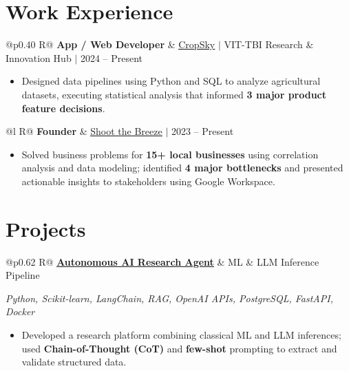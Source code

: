 \documentclass[a4paper,10pt]{article}
\newcommand{\ulink}[2]{\href{#1}{\uline{#2}}}
\newcommand{\subheading}[1]{{\color[HTML]{0A0A0A}\fontsize{12}{14}\selectfont\bfseries #1}}
\newcommand{\techstack}[1]{{\color[HTML]{5C5C5C}\fontsize{10.5}{12.5}\selectfont\itshape #1}}
\newcommand{\meta}[1]{{\color[HTML]{5C5C5C}\fontsize{10.5}{12.5}\selectfont #1}}
\begin{document}
\section{Work Experience}
\vspace{2pt}

\begin{tabularx}{\linewidth}{@{}p{0.40\linewidth} R@{}}
\subheading{App / Web Developer} & \meta{\ulink{https://sites.google.com/view/cropsky/home}{CropSky} $|$ VIT-TBI Research \& Innovation Hub $|$ 2024 -- Present}
\end{tabularx}
\begin{itemize}[nosep, leftmargin=1.5em, itemsep=1pt, topsep=2pt]
  \item {\color[HTML]{0A0A0A}\fontsize{11}{14}\selectfont Designed data pipelines using Python and SQL to analyze agricultural datasets, executing statistical analysis that informed \textbf{3 major product feature decisions}.}
\end{itemize}

\vspace{2pt}

\begin{tabularx}{\linewidth}{@{}l R@{}}
\subheading{Founder} & \meta{\ulink{https://shoot-the-breeze.vercel.app}{Shoot the Breeze} $|$ 2023 -- Present}
\end{tabularx}
\begin{itemize}[nosep, leftmargin=1.5em, itemsep=1pt, topsep=2pt]
  \item {\color[HTML]{0A0A0A}\fontsize{11}{14}\selectfont Solved business problems for \textbf{15+ local businesses} using correlation analysis and data modeling; identified \textbf{4 major bottlenecks} and presented actionable insights to stakeholders using Google Workspace.}
\end{itemize}

\vspace{2pt}

\section{Projects}
\vspace{2pt}

\begin{tabularx}{\linewidth}{@{}p{0.62\linewidth} R@{}}
\subheading{\ulink{https://github.com/su-jin1425/Autonomous-Research-Agent}{Autonomous AI Research Agent}} & \meta{ML \& LLM Inference Pipeline}
\end{tabularx}
\vspace{1pt}
\techstack{Python, Scikit-learn, LangChain, RAG, OpenAI APIs, PostgreSQL, FastAPI, Docker}
\begin{itemize}[nosep, leftmargin=1.5em, itemsep=1pt, topsep=2pt]
  \item {\color[HTML]{0A0A0A}\fontsize{11}{14}\selectfont Developed a research platform combining classical ML and LLM inferences; used \textbf{Chain-of-Thought (CoT)} and \textbf{few-shot} prompting to extract and validate structured data.}
\end{itemize}
\end{document}
